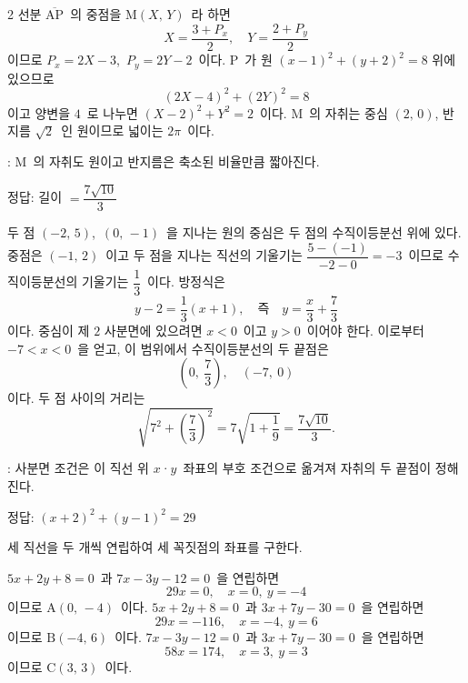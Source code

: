 \documentclass[10pt,fleqn]{article}
\begin{document}
\begin{multicols*}{2}
선분 $\overline{\mathrm{AP}}$\ 의 중점을 $\mathrm{M}(X,\, Y)$\ 라 하면
\[ X = \dfrac{3 + P_x}{2},\quad Y = \dfrac{2 + P_y}{2} \]
이므로 $P_x = 2X - 3$,\ $P_y = 2Y - 2$\ 이다. $\mathrm{P}$\ 가 원 $(x-1)^2 + (y+2)^2 = 8$ 위에 있으므로
\[ (2X - 4)^2 + (2Y)^2 = 8 \]
이고 양변을 $4$\ 로 나누면 $(X-2)^2 + Y^2 = 2$\ 이다. $\mathrm{M}$\ 의 자취는 중심 $(2,\, 0)$, 반지름 $\sqrt{2}$\ 인 원이므로 넓이는 $2\pi$\ 이다.

\begin{dmcriticalpoint}
: $\mathrm{M}$\ 의 자취도 원이고 반지름은 축소된 비율만큼 짧아진다.
\end{dmcriticalpoint}

\begin{dmanswerbox}
정답: 길이 $=\dfrac{7\sqrt{10}}{3}$
\end{dmanswerbox}

두 점 $(-2,\, 5)$,\ $(0,\, -1)$\ 을 지나는 원의 중심은 두 점의 수직이등분선 위에 있다. 중점은 $(-1,\, 2)$\ 이고 두 점을 지나는 직선의 기울기는 $\dfrac{5-(-1)}{-2-0} = -3$\ 이므로 수직이등분선의 기울기는 $\dfrac{1}{3}$\ 이다. 방정식은
\[ y - 2 = \dfrac{1}{3}(x + 1),\quad \text{즉}\quad y = \dfrac{x}{3} + \dfrac{7}{3} \]
이다. 중심이 제 $2$ 사분면에 있으려면 $x < 0$\ 이고 $y > 0$\ 이어야 한다. 이로부터 $-7 < x < 0$\ 을 얻고, 이 범위에서 수직이등분선의 두 끝점은
\[ \left( 0,\ \dfrac{7}{3} \right),\quad (-7,\ 0) \]
이다. 두 점 사이의 거리는
\[ \sqrt{7^2 + \left( \dfrac{7}{3} \right)^2} = 7\sqrt{1 + \dfrac{1}{9}} = \dfrac{7\sqrt{10}}{3}. \]

\begin{dmcriticalpoint}
: 사분면 조건은 이 직선 위 $x$·$y$\ 좌표의 부호 조건으로 옮겨져 자취의 두 끝점이 정해진다.
\end{dmcriticalpoint}

\begin{dmanswerbox}
정답: $(x+2)^2+(y-1)^2=29$
\end{dmanswerbox}

세 직선을 두 개씩 연립하여 세 꼭짓점의 좌표를 구한다.

$5x + 2y + 8 = 0$\ 과 $7x - 3y - 12 = 0$\ 을 연립하면
\[ 29x = 0,\quad x = 0,\ y = -4 \]
이므로 $\mathrm{A}(0,\, -4)$\ 이다. $5x + 2y + 8 = 0$\ 과 $3x + 7y - 30 = 0$\ 을 연립하면
\[ 29x = -116,\quad x = -4,\ y = 6 \]
이므로 $\mathrm{B}(-4,\, 6)$\ 이다. $7x - 3y - 12 = 0$\ 과 $3x + 7y - 30 = 0$\ 을 연립하면
\[ 58x = 174,\quad x = 3,\ y = 3 \]
이므로 $\mathrm{C}(3,\, 3)$\ 이다.


\end{multicols*}
\end{document}

